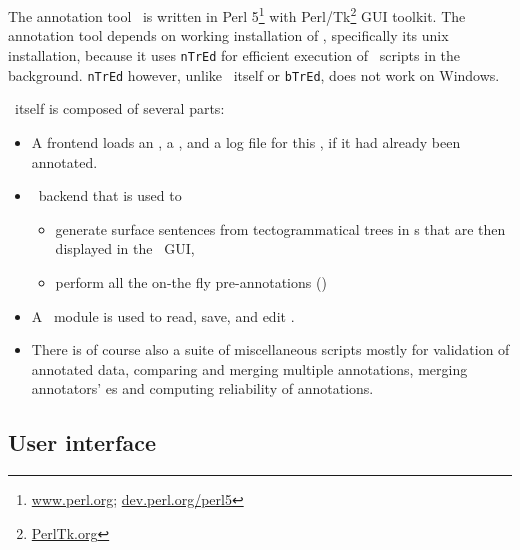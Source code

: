 
\chapter{\seman}
\label{sec:seman}
The annotation tool \seman\ is written in Perl 5\footnote{\url{www.perl.org}; \url{dev.perl.org/perl5}} with Perl/Tk\footnote{\url{PerlTk.org}} GUI toolkit. The annotation tool depends on working installation of \tred, specifically its unix installation, because it uses \texttt{nTrEd} for efficient execution of \tred\ scripts in the background. \texttt{nTrEd} however, unlike \tred\ itself or \texttt{bTrEd}, does not work on Windows.%

 \seman\ itself is composed of several parts:
\begin{itemize}
  \item A frontend loads an \sf, a \semlex,  and a log file for this \sf, if it had already been annotated. 
  \item \ntred\ backend that is used to 
	\begin{itemize}
	  \item generate surface sentences from tectogrammatical trees in \tf{}s that are then displayed in the \seman\ GUI,
	  \item perform all the on-the fly pre-annotations ()
	\end{itemize}
  \item A \semlex\ module is used to read, save, and edit \semlex.
  \item There is of course also a suite of miscellaneous scripts mostly for validation of annotated data, comparing and merging multiple annotations, merging annotators' \semlex{}es and computing reliability of annotations.
\end{itemize}

\section{User interface}
\label{sec:seman:gui}

